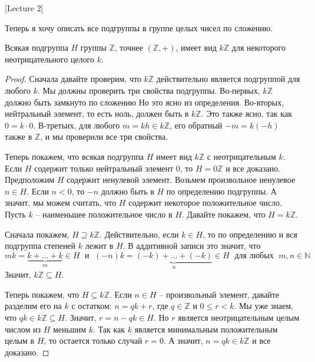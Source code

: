 [Lecture 2]


Теперь я хочу описать все подгруппы в группе целых чисел по сложению.

\begin{claim}
\label{claim::Zsubgroups}
Всякая подгруппа $H$ группы $\mathbb Z$, точнее $(\mathbb Z, +)$, имеет вид $k\mathbb Z$ для некоторого неотрицательного целого $k$.
\end{claim}
\begin{proof}
Сначала давайте проверим, что $k \mathbb Z$ действительно является подгруппой для любого $k$.
Мы должны проверить три свойства подгруппы.
Во-первых, $k\mathbb Z$ должно быть замкнуто по сложению
Но это ясно из определения.
Во-вторых, нейтральный элемент, то есть ноль, должен быть в $k\mathbb Z$.
Это также ясно, так как $0 = k \cdot 0$.
В-третьих, для любого $m = kh \in k\mathbb Z$, его обратный $-m= k(-h)$ также в $\mathbb Z$, и мы проверили все три свойства.

Теперь покажем, что всякая подгруппа $H$ имеет вид $k \mathbb Z$ с неотрицательным $k$.
Если $H$ содержит только нейтральный элемент $0$,  то $H = 0\mathbb Z$ и все доказано.
Предположим $H$ содержит ненулевой элемент.
Возьмем произвольное ненулевое $n \in H$.
Если $n < 0$, то $-n$ должно быть в $H$ по определению подгруппы.
А значит, мы можем считать, что $H$ содержит некоторое положительное число.
Пусть $k$ -- наименьшее положительное число в $H$.
Давайте покажем, что $H = k \mathbb Z$.

Сначала покажем, $H \supseteq k \mathbb Z$.
Действительно, если $k\in H$, то по определению и вся подгруппа степеней $k$ лежит в $H$.
В аддитивной записи это значит, что
\[
mk  = \underbrace{k + \ldots + k}_m \in H\;\text{ и }\;(-n)k=\underbrace{(-k) + \ldots + (-k)}_n\in H\; \text{ для любых }\;m, n\in \mathbb N
\]
Значит, $k\mathbb Z\subseteq H$.

Теперь покажем, что $H\subseteq k\mathbb Z$.
Если $n\in H$ -- произвольный элемент, давайте разделим его на $k$ с остатком: $n = q k + r$, где $q\in \mathbb Z$ и $0 \leqslant r < k$.
Мы уже знаем, что $qk \in k\mathbb Z\subseteq H$.
Значит, $r = n - qk \in H$.
Но $r$ является неотрицательным целым числом из $H$ меньшим $k$.
Так как $k$ является минимальным положительным целым в $H$, то остается только случай $r = 0$.
А значит, $n = qk\in k\mathbb Z$ и все доказано.
\end{proof}

